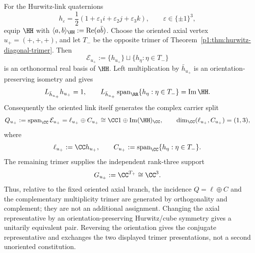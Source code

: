 \documentclass[11pt]{article}
\begin{document}
\begin{theorem}
\label{p1:thm:axial-opposite-trimer-quaternionic-frame}
For the Hurwitz-link quaternions
\[
 h_\varepsilon
 =\frac12(1+\varepsilon_1i+\varepsilon_2j+\varepsilon_3k),
 \qquad \varepsilon\in\{\pm1\}^3,
\]
equip \(\HH\) with
\(\langle a,b\rangle_{\HH}:=\operatorname{Re}(a\bar b)\).
Choose the oriented axial vertex \(u_+=(+,+,+)\), and let \(T_-\) be the
opposite trimer of Theorem~\ref{p1:thm:hurwitz-diagonal-trimer}.  Then
\[
 \mathcal E_{u_+}:=
 \{h_{u_+}\}\sqcup\{h_\eta:\eta\in T_-\}
\]
is an orthonormal real basis of \(\HH\).  Left multiplication by
\(\bar h_{u_+}\) is an orientation-preserving isometry and gives
\[
 L_{\bar h_{u_+}}h_{u_+}=1,
 \qquad
 L_{\bar h_{u_+}}
 \operatorname{span}_{\RR}\{h_\eta:\eta\in T_-\}
 =\operatorname{Im}\HH.
\]
Consequently the oriented link itself generates the complex carrier split
\begin{equation}
\label{p1:eq:generated-oriented-one-plus-three}
 Q_{u_+}
 :=\operatorname{span}_{\CC}\mathcal E_{u_+}
 =\ell_{u_+}\oplus C_{u_+}
 \cong \CC1\oplus\operatorname{Im}(\HH)_{\CC},
 \qquad
 \dim_{\CC}(\ell_{u_+},C_{u_+})=(1,3),
\end{equation}
where
\[
 \ell_{u_+}:=\CC h_{u_+},
 \qquad
 C_{u_+}:=\operatorname{span}_{\CC}\{h_\eta:\eta\in T_-\}.
\]
The remaining trimer supplies the independent rank-three support
\begin{equation}
\label{p1:eq:generated-oriented-complementary-trimer}
 G_{u_+}:=\CC^{T_+}\cong\CC^3.
\end{equation}
Thus, relative to the fixed oriented axial branch, the incidence
\(Q=\ell\oplus C\) and the complementary multiplicity trimer are generated
by orthogonality and complement; they are not an additional assignment.
Changing the axial representative by an orientation-preserving Hurwitz/cube
symmetry gives a unitarily equivalent pair.  Reversing the orientation gives
the conjugate representative and exchanges the two displayed trimer
presentations, not a second unoriented constitution.
\end{theorem}
\end{document}
